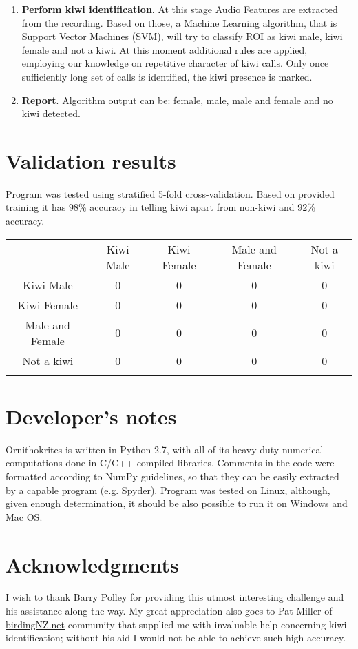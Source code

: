 \documentclass[paper=a4, fontsize=11pt]{scrartcl}	%
\numberwithin{equation}{section}		%
\numberwithin{figure}{section}			%
\numberwithin{table}{section}				%
\begin{document}
\begin{enumerate}
	\item \textbf{Perform kiwi identification}. At this stage Audio Features are extracted from the recording. Based on those, a Machine Learning algorithm, that is Support Vector Machines (SVM), will try to classify ROI as kiwi male, kiwi female and not a kiwi. At this moment additional rules are applied, employing our knowledge on repetitive character of kiwi calls. Only once sufficiently long set of calls is identified, the kiwi presence is marked. 
	\item \textbf{Report}. Algorithm output can be: female, male, male and female and no kiwi detected.
\end{enumerate}

\section{Validation results}
Program was tested using stratified 5-fold cross-validation. Based on provided training it has $98$\% accuracy in telling kiwi apart from non-kiwi and $92$\% accuracy.
\begin{table}[hp]
\begin{tabularx}{.7\textwidth}{c|c c c c |}
 & Kiwi Male & Kiwi Female & Male and Female & \multicolumn{1}{c}{Not a kiwi} \\
\hhline{-----}
Kiwi Male & 0 \cellcolor[gray]{.8}& 0 & 0 & 0 \\
Kiwi Female & 0 & 0 \cellcolor[gray]{.8}& 0 & 0 \\
Male and Female & 0 & 0 & 0 \cellcolor[gray]{.8} & 0 \\
Not a kiwi & 0 & 0 & 0 & 0 \cellcolor[gray]{.8} \\
\hhline{~----}
\end{tabularx}
\end{table}

\section{Developer's notes}
Ornithokrites is written in Python 2.7, with all of its heavy-duty numerical computations done in C/C++ compiled libraries. Comments in the code were formatted according to NumPy guidelines, so that they can be easily extracted by a capable program (e.g. Spyder). Program was tested on Linux, although, given enough determination, it should be also possible to run it on Windows and Mac OS. 

\section{Acknowledgments}
I wish to thank Barry Polley for providing this utmost interesting challenge and his assistance along the way. My great appreciation also goes to Pat Miller of \url{birdingNZ.net} community that supplied me with invaluable help concerning kiwi identification; without his aid I would not be able to achieve such high accuracy.

\end{document}
